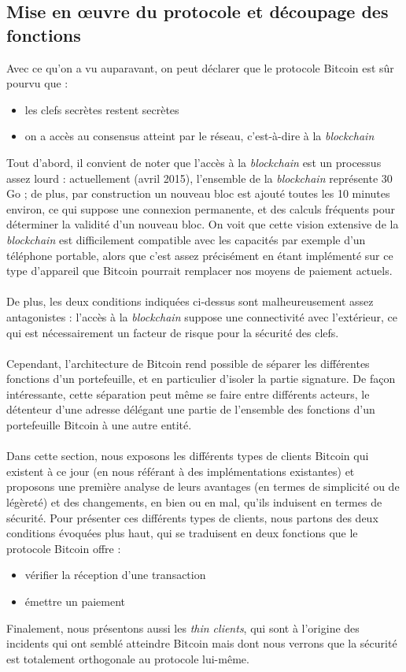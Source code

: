\documentclass[11pt,a4paper]{article}
\begin{document}
\subsection{Mise en \oe{}uvre du protocole et découpage des fonctions}
Avec ce qu'on a vu auparavant, on peut déclarer que le protocole Bitcoin est sûr pourvu que :\begin{itemize}
	\item les clefs secrètes restent secrètes
	\item on a accès au consensus atteint par le réseau, c'est-à-dire à la \textit{blockchain}\\
\end{itemize}
Tout d'abord, il convient de noter que l'accès à la \textit{blockchain} est un processus assez lourd : actuellement (avril 2015), l'ensemble de la \textit{blockchain} représente 30 Go ; de plus, par construction un nouveau bloc est ajouté toutes les 10 minutes environ, ce qui suppose une connexion permanente, et des calculs fréquents pour déterminer la validité d'un nouveau bloc. On voit que cette vision extensive de la \textit{blockchain} est difficilement compatible avec les capacités par exemple d'un téléphone portable, alors que c'est assez précisément en étant implémenté sur ce type d'appareil que Bitcoin pourrait remplacer nos moyens de paiement actuels.\\\\ 
De plus, les deux conditions indiquées ci-dessus sont malheureusement assez antagonistes : l'accès à la \textit{blockchain} suppose une connectivité avec l'extérieur, ce qui est nécessairement un facteur de risque pour la sécurité des clefs.\\\\
Cependant, l'architecture de Bitcoin rend possible de séparer les différentes fonctions d'un portefeuille, et en particulier d'isoler la partie signature. De façon intéressante, cette séparation peut même se faire entre différents acteurs, le détenteur d'une adresse délégant une partie de l'ensemble des fonctions d'un portefeuille Bitcoin à une autre entité.\\\\
Dans cette section, nous exposons les différents types de clients Bitcoin qui existent à ce jour (en nous référant à des implémentations existantes) et proposons une première analyse de leurs avantages (en termes de simplicité ou de légèreté) et des changements, en bien ou en mal, qu'ils induisent en termes de sécurité. Pour présenter ces différents types de clients, nous partons des deux conditions évoquées plus haut, qui se traduisent en deux fonctions que le protocole Bitcoin offre : \begin{itemize}
	\item vérifier la réception d'une transaction
	\item émettre un paiement
\end{itemize}
Finalement, nous présentons aussi les \textit{thin clients}, qui sont à l'origine des incidents qui ont semblé atteindre Bitcoin mais dont nous verrons que la sécurité est totalement orthogonale au protocole lui-même. 
\end{document}
